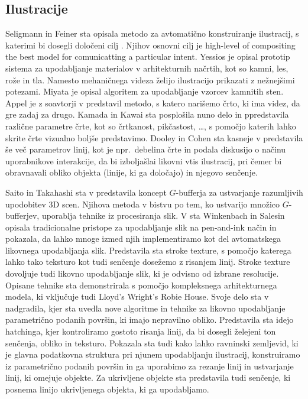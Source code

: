 \subsection{Ilustracije}
Seligmann in Feiner sta opisala metodo za avtomatično konstruiranje ilustracij, s katerimi bi dosegli določeni cilj \cite{Seligmann:Automated}. Njihov osnovni cilj je high-level of compositing the best model for comunicatting a particular intent. Yessios je opisal prototip sistema za upodabljanje materialov v arhitekturnih načrtih, kot so kamni, les, rože in tla. Namesto mehaničnega videza želijo ilustracijo prikazati z nežnejšimi potezami. %
Miyata \cite{Miyata:Stone} je opisal algoritem za upodabljanje vzorcev kamnitih sten. Appel je z soavtorji v \cite{Appel:Haloed} predstavil metodo, s katero narišemo črto, ki ima videz, da gre zadaj za drugo. Kamada in Kawai \cite{Kamada:Hidden} sta posplošila nuno delo in ppredstavila različne parametre črte, kot so črtkanost, pikčastost, \ldots, s pomočjo katerih lahko skrite črte vizualno boljše predstavimo. Dooley in Cohen sta kasneje v \cite{Dooley:Lines, Dooley:Surfaces}  predstavila še več parametrov linij, kot je npr.\ debelina črte in podala diskusijo o načinu uporabnikove interakcije, da bi izboljašlai likovni vtis ilustracij, pri čemer bi obravnavali obliko objekta (linije, ki ga določajo) in njegovo senčenje.

Saito in Takahashi sta v \cite{Saito:3Dshapes} predstavila koncept $G$-bufferja %
za ustvarjanje razumljivih upodobitev 3D scen. Njihova metoda v bistvu po tem, ko ustvarijo množico $G$-bufferjev, uporablja tehnike iz procesiranja slik. V \cite{Wikenbach:ComputerGenerated} sta Winkenbach in Salesin opisala tradicionalne pristope za upodabljanje slik na pen-and-ink način in pokazala, da lahko mnoge izmed njih implementiramo kot del avtomatskega likovnega upodabljanja slik. Predstavila sta stroke texture, %
s pomočjo katerega lahko tako teksturo kot tudi senčenje dosežemo z risanjem linij. Stroke texture dovoljuje tudi likovno upodabljanje slik, ki je odvisno od izbrane resolucije. Opisane tehnike sta demonstrirala s pomočjo kompleksnega arhitekturnega modela, ki vključuje tudi Lloyd's Wright's Robie House. Svoje delo sta v \cite{Winkenbach:ParametricSurfaces} nadgradila, kjer sta uvedla nove algoritme in tehnike za likovno upodabljanje parametrično podanih površin, ki imajo nepravilno obliko. Predstavila sta idejo hatchinga, %
kjer kontroliramo gostoto risanja linij, da bi dosegli želejeni ton senčenja, obliko in teksturo. Pokazala sta tudi kako lahko ravninski zemljevid, %
ki je glavna podatkovna struktura pri njunem upodabljanju ilustracij, konstruiramo iz parametrično podanih površin in ga uporabimo za rezanje linij in ustvarjanje linij, ki omejuje objekte. Za ukrivljene objekte sta predstavila tudi senčenje, ki posnema linijo ukrivljenega objekta, ki ga upodabljamo.

